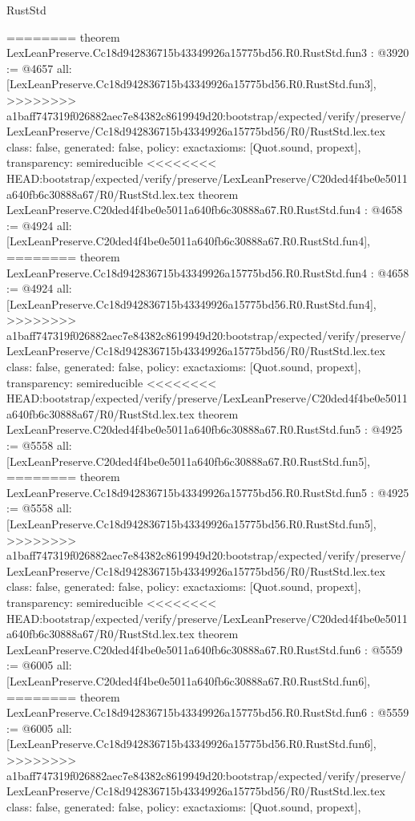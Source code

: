 \begin{lexlean}{RustStd}
\begin{coremodule}
{\begin{coremodule}
{{{{{{========
theorem LexLeanPreserve.Cc18d942836715b43349926a15775bd56.R0.RustStd.fun3 : @3920 := @4657 {
  all: [LexLeanPreserve.Cc18d942836715b43349926a15775bd56.R0.RustStd.fun3],
>>>>>>>> a1baff747319f026882aec7e84382c8619949d20:bootstrap/expected/verify/preserve/LexLeanPreserve/Cc18d942836715b43349926a15775bd56/R0/RustStd.lex.tex
  class: false,
  generated: false,
  policy: exact{axioms: [Quot.sound, propext]},
  transparency: semireducible
}
<<<<<<<< HEAD:bootstrap/expected/verify/preserve/LexLeanPreserve/C20ded4f4be0e5011a640fb6c30888a67/R0/RustStd.lex.tex
theorem LexLeanPreserve.C20ded4f4be0e5011a640fb6c30888a67.R0.RustStd.fun4 : @4658 := @4924 {
  all: [LexLeanPreserve.C20ded4f4be0e5011a640fb6c30888a67.R0.RustStd.fun4],
========
theorem LexLeanPreserve.Cc18d942836715b43349926a15775bd56.R0.RustStd.fun4 : @4658 := @4924 {
  all: [LexLeanPreserve.Cc18d942836715b43349926a15775bd56.R0.RustStd.fun4],
>>>>>>>> a1baff747319f026882aec7e84382c8619949d20:bootstrap/expected/verify/preserve/LexLeanPreserve/Cc18d942836715b43349926a15775bd56/R0/RustStd.lex.tex
  class: false,
  generated: false,
  policy: exact{axioms: [Quot.sound, propext]},
  transparency: semireducible
}
<<<<<<<< HEAD:bootstrap/expected/verify/preserve/LexLeanPreserve/C20ded4f4be0e5011a640fb6c30888a67/R0/RustStd.lex.tex
theorem LexLeanPreserve.C20ded4f4be0e5011a640fb6c30888a67.R0.RustStd.fun5 : @4925 := @5558 {
  all: [LexLeanPreserve.C20ded4f4be0e5011a640fb6c30888a67.R0.RustStd.fun5],
========
theorem LexLeanPreserve.Cc18d942836715b43349926a15775bd56.R0.RustStd.fun5 : @4925 := @5558 {
  all: [LexLeanPreserve.Cc18d942836715b43349926a15775bd56.R0.RustStd.fun5],
>>>>>>>> a1baff747319f026882aec7e84382c8619949d20:bootstrap/expected/verify/preserve/LexLeanPreserve/Cc18d942836715b43349926a15775bd56/R0/RustStd.lex.tex
  class: false,
  generated: false,
  policy: exact{axioms: [Quot.sound, propext]},
  transparency: semireducible
}
<<<<<<<< HEAD:bootstrap/expected/verify/preserve/LexLeanPreserve/C20ded4f4be0e5011a640fb6c30888a67/R0/RustStd.lex.tex
theorem LexLeanPreserve.C20ded4f4be0e5011a640fb6c30888a67.R0.RustStd.fun6 : @5559 := @6005 {
  all: [LexLeanPreserve.C20ded4f4be0e5011a640fb6c30888a67.R0.RustStd.fun6],
========
theorem LexLeanPreserve.Cc18d942836715b43349926a15775bd56.R0.RustStd.fun6 : @5559 := @6005 {
  all: [LexLeanPreserve.Cc18d942836715b43349926a15775bd56.R0.RustStd.fun6],
>>>>>>>> a1baff747319f026882aec7e84382c8619949d20:bootstrap/expected/verify/preserve/LexLeanPreserve/Cc18d942836715b43349926a15775bd56/R0/RustStd.lex.tex
  class: false,
  generated: false,
  policy: exact{axioms: [Quot.sound, propext]},
}}}}}}}}}}
\end{coremodule}}
\end{coremodule}
\end{lexlean}
